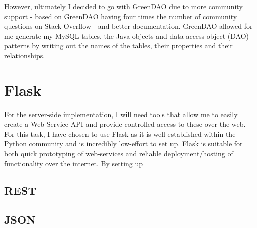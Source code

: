 However, ultimately I decided to go with GreenDAO due to more community support - based on GreenDAO having four times the number of community questions on Stack Overflow - and better documentation.
GreenDAO allowed for me generate my MySQL tables, the Java objects and data access object (DAO) patterns by writing out the names of the tables, their properties and their relationships. 

\section{Flask}
For the server-side implementation, I will need tools that allow me to easily create a Web-Service API and provide controlled access to these over the web.
For this task, I have chosen to use Flask as it is well established within the Python community and is incredibly low-effort to set up. 
Flask is suitable for both quick prototyping of web-services and reliable deployment/hosting of functionality over the internet.
By setting up 

\subsection{REST}

\subsection{JSON}